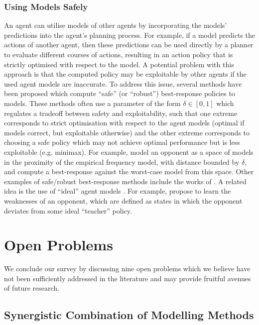 \documentclass[final,1p,times,authoryear]{elsarticle}
\begin{document}
			\subsubsection{Using Models Safely} \label{sec:other-safety}

An agent can utilise models of other agents by incorporating the models' predictions into the agent's planning process. For example, if a model predicts the actions of another agent, then these predictions can be used directly by a planner to evaluate different courses of actions, resulting in an action policy that is strictly optimised with respect to the model. A potential problem with this approach is that the computed policy may be exploitable by other agents if the used agent models are inaccurate. To address this issue, several methods have been proposed which compute ``safe'' (or ``robust'') best-response policies to models. These methods often use a parameter of the form $\delta \in [0,1]$ which regulates a tradeoff between safety and exploitability, such that one extreme corresponds to strict optimisation with respect to the agent models (optimal if models correct, but exploitable otherwise) and the other extreme corresponds to choosing a safe policy which may not achieve optimal performance but is less exploitable (e.g. minimax). For example, \citet{wbmp2011} model an opponent as a space of models in the proximity of the empirical frequency model, with distance bounded by $\delta$, and compute a best-response against the worst-case model from this space. Other examples of safe/robust best-response methods include the works of \citet{jb2009,jzb2008,mb2004,cm1996search93}. A related idea is the use of ``ideal'' agent models \citep{srv2000}. For example, \citet{mr2005} propose to learn the weaknesses of an opponent, which are defined as states in which the opponent deviates from some ideal ``teacher'' policy.


	\section{Open Problems} \label{sec:openprob}

We conclude our survey by discussing nine open problems which we believe have not been sufficiently addressed in the literature and may provide fruitful avenues of future research.


		\subsection{Synergistic Combination of Modelling Methods}
\end{document}
